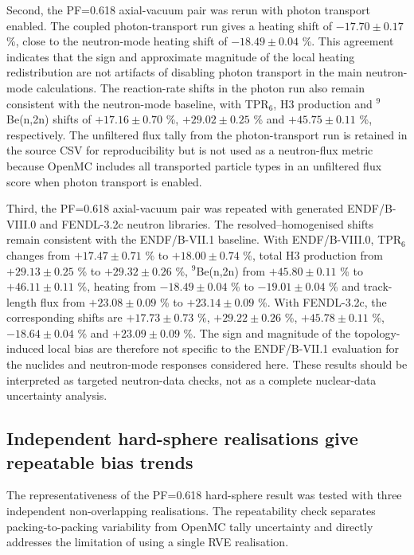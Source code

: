 \documentclass[preprint,12pt]{elsarticle}
\begin{document}
Second, the PF=0.618 axial-vacuum pair was rerun with photon transport enabled.
The coupled photon-transport run gives a
heating shift of $-17.70\pm0.17$ \%, close to the neutron-mode heating shift of
$-18.49\pm0.04$ \%.  This agreement indicates that the sign and approximate
magnitude of the local heating redistribution are not artifacts of disabling
photon transport in the main neutron-mode calculations.  The reaction-rate
shifts in the photon run also remain consistent with the neutron-mode baseline,
with TPR$_6$, H3 production and $^9$Be(n,2n) shifts of
$+17.16\pm0.70$ \%, $+29.02\pm0.25$ \% and $+45.75\pm0.11$ \%, respectively.
The unfiltered flux tally from the photon-transport run is retained in the
source CSV for reproducibility but is not used as a neutron-flux metric because
OpenMC includes all transported particle types in an unfiltered flux score when
photon transport is enabled.

Third, the PF=0.618 axial-vacuum pair was repeated with generated
ENDF/B-VIII.0 and FENDL-3.2c neutron libraries.  The resolved--homogenised
shifts remain consistent with the ENDF/B-VII.1 baseline.  With ENDF/B-VIII.0,
TPR$_6$ changes from $+17.47\pm0.71$ \% to $+18.00\pm0.74$ \%, total H3
production from $+29.13\pm0.25$ \% to $+29.32\pm0.26$ \%, $^9$Be(n,2n) from
$+45.80\pm0.11$ \% to $+46.11\pm0.11$ \%, heating from $-18.49\pm0.04$ \% to
$-19.01\pm0.04$ \% and track-length flux from $+23.08\pm0.09$ \% to
$+23.14\pm0.09$ \%.  With FENDL-3.2c, the corresponding shifts are
$+17.73\pm0.73$ \%, $+29.22\pm0.26$ \%, $+45.78\pm0.11$ \%,
$-18.64\pm0.04$ \% and $+23.09\pm0.09$ \%.  The sign and magnitude of the
topology-induced local bias are therefore not specific to the ENDF/B-VII.1
evaluation for the nuclides and neutron-mode responses considered here.  These
results should be interpreted as targeted neutron-data checks, not as a
complete nuclear-data uncertainty analysis.



\subsection{Independent hard-sphere realisations give repeatable bias trends}

The representativeness of the PF=0.618 hard-sphere result was tested with three
independent non-overlapping realisations.  The repeatability check separates
packing-to-packing variability from OpenMC tally uncertainty and directly
addresses the limitation of using a single RVE realisation.
\end{document}
